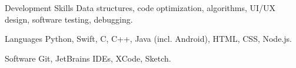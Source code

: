 
\begin{cvskills}

  \cvskill
    {Development Skills} %
    {Data structures, code optimization, algorithms, UI/UX design, software testing, debugging. } %

  \cvskill
    {Languages} %
    {Python, Swift, C, C++, Java (incl. Android), HTML, CSS, Node.js.} %

  \cvskill
    {Software} %
    {Git, JetBrains IDEs, XCode, Sketch.} %

\end{cvskills}

